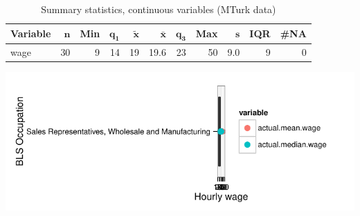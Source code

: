 \documentclass[a4paper,10pt]{article}\usepackage[]{graphicx}\usepackage[]{color}
\makeatletter
\def\maxwidth{ %
  \ifdim\Gin@nat@width>\linewidth
    \linewidth
  \else
    \Gin@nat@width
  \fi
}
\makeatother
\begin{document}
\begin{table}[ht]
\centering
{\footnotesize
\begin{tabular}{lrrrrrrrrrr}
 \textbf{Variable} & $\mathbf{n}$ & \textbf{Min} & $\mathbf{q_1}$ & $\mathbf{\widetilde{x}}$ & $\mathbf{\bar{x}}$ & $\mathbf{q_3}$ & \textbf{Max} & $\mathbf{s}$ & \textbf{IQR} & \textbf{\#NA} \\ 
  \hline
wage & 30 & 9 & 14 & 19 & 19.6 & 23 & 50 & 9.0 & 9 & 0 \\ 
  \end{tabular}
}
\caption{Summary statistics, continuous variables (MTurk data)} 
\label{tab2:41-4010}
\end{table}


{\centering \includegraphics[width=\maxwidth]{figure/unnamed-chunk-217} 

}
\end{document}
